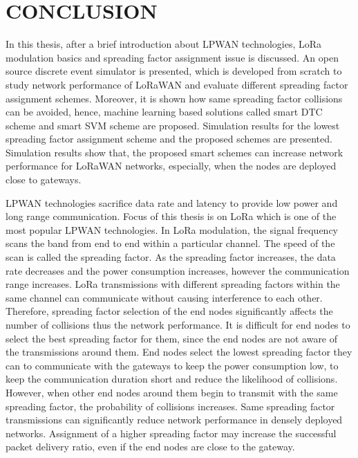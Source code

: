 \chapter{CONCLUSION}\label{ch:conclusion}

In this thesis, after a brief introduction about LPWAN technologies, LoRa modulation basics and spreading factor assignment issue is discussed. An open source discrete event simulator is presented, which is developed from scratch to study network performance of LoRaWAN and evaluate different spreading factor assignment schemes. Moreover, it is shown how same spreading factor collisions can be avoided, hence, machine learning based solutions called smart DTC scheme and smart SVM scheme are proposed. Simulation results for the lowest spreading factor assignment scheme and the proposed schemes are presented. Simulation results show that, the proposed smart schemes can increase network performance for LoRaWAN networks, especially, when the nodes are deployed close to gateways.

LPWAN technologies sacrifice data rate and latency to provide low power and long range communication. Focus of this thesis is on LoRa which is one of the most popular LPWAN technologies. In LoRa modulation, the signal frequency scans the band from end to end within a particular channel. The speed of the scan is called the spreading factor. As the spreading factor increases, the data rate decreases and the power consumption increases, however the communication range increases. LoRa transmissions with different spreading factors within the same channel can communicate without causing interference to each other. Therefore, spreading factor selection of the end nodes significantly affects the number of collisions thus the network performance. It is difficult for end nodes to select the best spreading factor for them, since the end nodes are not aware of the transmissions around them. End nodes select the lowest spreading factor they can to communicate with the gateways to keep the power consumption low, to keep the communication duration short and reduce the likelihood of collisions. However, when other end nodes around them begin to transmit with the same spreading factor, the probability of collisions increases. Same spreading factor transmissions can significantly reduce network performance in densely deployed networks. Assignment of a higher spreading factor may increase the successful packet delivery ratio, even if the end nodes are close to the gateway.

